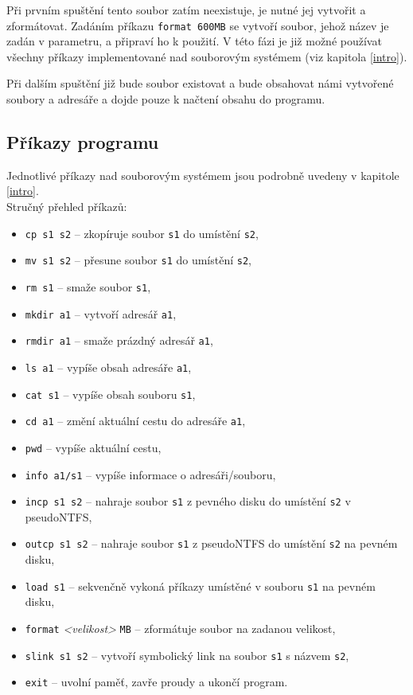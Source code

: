 \documentclass[
11pt,
a4paper,
pdftex,
czech,
titlepage
]{report}
\begin{document}
Při prvním spuštění tento soubor zatím neexistuje, je nutné jej vytvořit a zformátovat. Zadáním příkazu \texttt{format 600MB} se vytvoří soubor, jehož název je zadán v parametru, a připraví ho k použití. V této fázi je již možné používat všechny příkazy implementované nad souborovým systémem (viz kapitola \ref{intro}).

Při dalším spuštění již bude soubor existovat a bude obsahovat námi vytvořené soubory a adresáře a dojde pouze k načtení obsahu do programu.

\subsection{Příkazy programu}
Jednotlivé příkazy nad souborovým systémem jsou podrobně uvedeny v kapitole \ref{intro}.\\[0.5\baselineskip]
\noindent Stručný přehled příkazů:
\begin{itemize}
\item \texttt{cp s1 s2} -- zkopíruje soubor \texttt{s1} do umístění \texttt{s2},
\item \texttt{mv s1 s2} -- přesune soubor \texttt{s1} do umístění \texttt{s2},
\item \texttt{rm s1} -- smaže soubor \texttt{s1},
\item \texttt{mkdir a1} -- vytvoří adresář \texttt{a1},
\item \texttt{rmdir a1} -- smaže prázdný adresář \texttt{a1},
\item \texttt{ls a1} -- vypíše obsah adresáře \texttt{a1},
\item \texttt{cat s1} -- vypíše obsah souboru \texttt{s1},
\item \texttt{cd a1} -- změní aktuální cestu do adresáře \texttt{a1},
\item \texttt{pwd} -- vypíše aktuální cestu,
\item \texttt{info a1/s1} -- vypíše informace o adresáři/souboru,
\item \texttt{incp s1 s2} -- nahraje soubor \texttt{s1} z pevného disku do umístění \texttt{s2} v pseudoNTFS,
\item \texttt{outcp s1 s2} -- nahraje soubor \texttt{s1} z pseudoNTFS do umístění \texttt{s2} na pevném disku,
\item \texttt{load s1} -- sekvenčně vykoná příkazy umístěné v souboru \texttt{s1} na pevném disku,
\item \texttt{format} \textit{<velikost>} \texttt{MB} -- zformátuje soubor na zadanou velikost,
\item \texttt{slink s1 s2} -- vytvoří symbolický link na soubor \texttt{s1} s názvem \texttt{s2},
\item \texttt{exit} -- uvolní paměť, zavře proudy a ukončí program.
\end{itemize}
\end{document}
